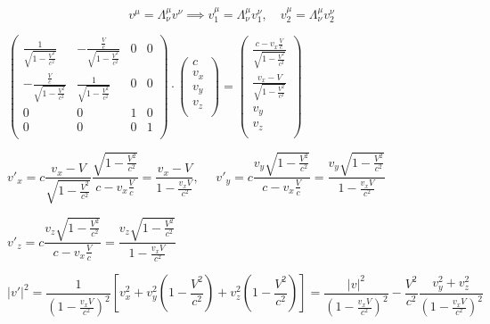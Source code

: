 \documentclass[a4paper,12pt]{article}
\begin{document}
	\begin{equation}
		v^\mu = \Lambda_{\nu}^{\mu} v^{\nu} \implies v_1^\mu = \Lambda_{\nu}^{\mu} v_1^\nu, \quad v_2^\mu = \Lambda_\nu^\mu v_2^\nu 
	\end{equation}
	
	\begin{center}
		$\left(\begin{array}{cccc}
			\frac{1}{\sqrt{1-\frac{V^2}{c^2}}} & -\frac{\frac{V}{c}}{\sqrt{1-\frac{V^2}{c^2}}} & 0 & 0 \\
			-\frac{\frac{V}{c}}{\sqrt{1-\frac{V^2}{c^2}}} & \frac{1}{\sqrt{1-\frac{V^2}{c^2}}} & 0 & 0 \\
			0 & 0 & 1 & 0 \\
			0 & 0 & 0 & 1 \\
		\end{array}\right)\cdot\left(
		\begin{array}{c}
			c \\
			v_x \\
			v_y \\
			v_z \\
		\end{array}\right) = \left(\begin{array}{c}
			\frac{c - v_x \frac{V}{c}}{\sqrt{1-\frac{V^2}{c^2}}} \\
			\frac{v_x - V}{\sqrt{1-\frac{V^2}{c^2}}} \\
			v_y \\
			v_z \\
		\end{array}\right)$
	\end{center}
	
	\begin{center}
		$v'_x = c \dfrac{v_x - V}{\sqrt{1-\frac{V^2}{c^2}}} \dfrac{\sqrt{1-\frac{V^2}{c^2}}}{c-v_x\frac{V}{c}} = \dfrac{v_x - V}{1 - \frac{v_x V}{c^2}}, \quad $
		$v'_y = c\dfrac{v_y\sqrt{1-\frac{V^2}{c^2}}}{c-v_x \frac{V}{c}} = \dfrac{v_y\sqrt{1 - \frac{V^2}{c^2}}}{1 - \frac{v_x V}{c^2}}$
		
		$v'_z = c\dfrac{v_z\sqrt{1-\frac{V^2}{c^2}}}{c-v_x \frac{V}{c}} = \dfrac{v_z\sqrt{1 - \frac{V^2}{c^2}}}{1 - \frac{v_x V}{c^2}}$
		
		$|v'|^2 = \dfrac{1}{\left(1 - \frac{v_x V}{c^2}\right)^2}\left[v_x^2 + v_y^2 \left(1 - \dfrac{V^2}{c^2}\right) + v_z^2 \left(1-\dfrac{V^2}{c^2}\right)\right] = \dfrac{|v|^2}{\left(1 - \frac{v_x V}{c^2}\right)^2} - \dfrac{V^2}{c^2} \dfrac{v_y^2  + v_z^2}{\left(1 - \frac{v_x V}{c^2}\right)^2}$
	\end{center}
	
\end{document}

